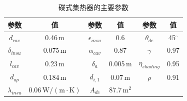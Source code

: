 \begin{table}[htbp]
	\setlength{\abovecaptionskip}{-10pt}
	\caption{碟式集热器的主要参数}
	\begin{center}
	\begin{tabular}{cccccc}
		\toprule
		参数		&	值	&	参数		&	值	&	参数		&	值\\
		\midrule
		$d_{cav}$	&	0.46$\,\mathrm{m}$	&	$\epsilon_{insu}$	&	0.6	&	$\theta_{dc}$	&	45$^\circ$\\
		$\delta_{insu}$	&	0.075$\,\mathrm{m}$	&	$\alpha_{cav}$	&	0.87	&	$\gamma$	&	0.97\\
		$l_{cav}$	&	0.23$\,\mathrm{m}$	&	$\delta_a$		&	0.005$\,\mathrm{m}$	&	$\eta_{shading}$	&	0.95\\
		$d_{ap}$	&	0.184$\,\mathrm{m}$	&	$d_{i,1}$	&	0.07$\,\mathrm{m}$	&	$\rho$	&	0.91\\
		$\lambda_{insu}$	&	0.06$\,\mathrm{W/(m\cdot K)}$	&	$A_{dc}$	&	87.7$\,\mathrm{m^2}$	&	\\		
		\bottomrule
	\end{tabular}
	\end{center}
	\label{tab:dc}
\end{table}


